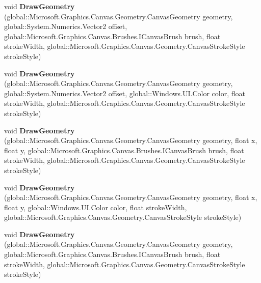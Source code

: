 \begin{DoxyCompactItemize}
void {\bfseries Draw\+Geometry} (global\+::\+Microsoft.\+Graphics.\+Canvas.\+Geometry.\+Canvas\+Geometry geometry, global\+::\+System.\+Numerics.\+Vector2 offset, global\+::\+Microsoft.\+Graphics.\+Canvas.\+Brushes.\+I\+Canvas\+Brush brush, float stroke\+Width, global\+::\+Microsoft.\+Graphics.\+Canvas.\+Geometry.\+Canvas\+Stroke\+Style stroke\+Style)
\item 
\mbox{\label{class_microsoft_1_1_graphics_1_1_canvas_1_1_canvas_drawing_session_add34c4d4870fd43ac514469057c52add}} 
void {\bfseries Draw\+Geometry} (global\+::\+Microsoft.\+Graphics.\+Canvas.\+Geometry.\+Canvas\+Geometry geometry, global\+::\+System.\+Numerics.\+Vector2 offset, global\+::\+Windows.\+U\+I.\+Color color, float stroke\+Width, global\+::\+Microsoft.\+Graphics.\+Canvas.\+Geometry.\+Canvas\+Stroke\+Style stroke\+Style)
\item 
\mbox{\label{class_microsoft_1_1_graphics_1_1_canvas_1_1_canvas_drawing_session_ab2e3b65d15b4f9a85d8164160f2618bd}} 
void {\bfseries Draw\+Geometry} (global\+::\+Microsoft.\+Graphics.\+Canvas.\+Geometry.\+Canvas\+Geometry geometry, float x, float y, global\+::\+Microsoft.\+Graphics.\+Canvas.\+Brushes.\+I\+Canvas\+Brush brush, float stroke\+Width, global\+::\+Microsoft.\+Graphics.\+Canvas.\+Geometry.\+Canvas\+Stroke\+Style stroke\+Style)
\item 
\mbox{\label{class_microsoft_1_1_graphics_1_1_canvas_1_1_canvas_drawing_session_afea11ead17f8826cbec4ad1cbaec2f3a}} 
void {\bfseries Draw\+Geometry} (global\+::\+Microsoft.\+Graphics.\+Canvas.\+Geometry.\+Canvas\+Geometry geometry, float x, float y, global\+::\+Windows.\+U\+I.\+Color color, float stroke\+Width, global\+::\+Microsoft.\+Graphics.\+Canvas.\+Geometry.\+Canvas\+Stroke\+Style stroke\+Style)
\item 
\mbox{\label{class_microsoft_1_1_graphics_1_1_canvas_1_1_canvas_drawing_session_a3ae15bd542556f05f5da92ab7dbe7d62}} 
void {\bfseries Draw\+Geometry} (global\+::\+Microsoft.\+Graphics.\+Canvas.\+Geometry.\+Canvas\+Geometry geometry, global\+::\+Microsoft.\+Graphics.\+Canvas.\+Brushes.\+I\+Canvas\+Brush brush, float stroke\+Width, global\+::\+Microsoft.\+Graphics.\+Canvas.\+Geometry.\+Canvas\+Stroke\+Style stroke\+Style)

\end{DoxyCompactItemize}
